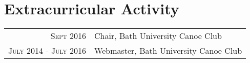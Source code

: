 \documentclass[a4paper,10pt]{article}
\begin{document}
\section{Extracurricular Activity}
\begin{tabular}{rl}
 \textsc{Sept} 2016 & Chair, Bath University Canoe Club\\
 \textsc{July} 2014 - \textsc{July} 2016 & Webmaster, Bath University Canoe Club\\
\end{tabular}



\end{document}
